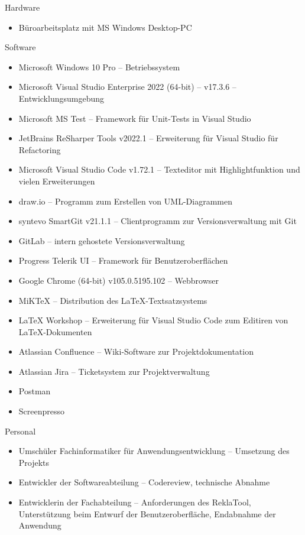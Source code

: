 Hardware
\begin{itemize}
    \item Büroarbeitsplatz mit MS Windows Desktop-PC
\end{itemize}
Software
\begin{itemize}
    \item Microsoft Windows 10 Pro -- Betriebssystem
    \item Microsoft Visual Studio Enterprise 2022 (64-bit) -- v17.3.6 -- Entwicklungsumgebung
    \item Microsoft MS Test -- Framework für Unit-Tests in Visual Studio
    \item JetBrains ReSharper Tools v2022.1 -- Erweiterung für Visual Studio für \ua Refactoring
    \item Microsoft Visual Studio Code v1.72.1 -- Texteditor mit Highlightfunktion und vielen Erweiterungen
    \item draw.io -- Programm zum Erstellen von UML-Diagrammen
    \item syntevo SmartGit v21.1.1 -- Clientprogramm zur Versionsverwaltung mit Git
    \item GitLab -- intern gehostete Versionsverwaltung
    \item Progress Telerik UI -- Framework für Benutzeroberflächen
    \item Google Chrome (64-bit) v105.0.5195.102 -- Webbrowser
    \item MiKTeX -- Distribution des LaTeX-Textsatzsystems
    \item LaTeX Workshop -- Erweiterung für Visual Studio Code zum Editiren von LaTeX-Dokumenten
    \item Atlassian Confluence -- Wiki-Software zur Projektdokumentation
    \item Atlassian Jira -- Ticketsystem zur Projektverwaltung
    \item Postman
    \item Screenpresso
\end{itemize}
Personal
\begin{itemize}
    \item Umschüler Fachinformatiker für Anwendungsentwicklung -- Umsetzung des Projekts
    \item Entwickler der Softwareabteilung  -- Codereview, technische Abnahme
    \item Entwicklerin der Fachabteilung -- Anforderungen des ReklaTool, Unterstützung beim Entwurf der Benutzeroberfläche,
    Endabnahme der Anwendung
\end{itemize}